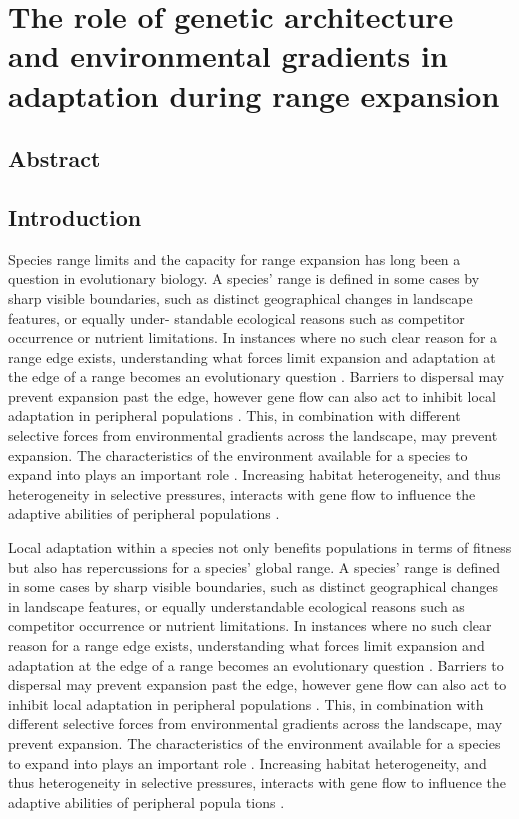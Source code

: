 \chapter{The role of genetic architecture and environmental gradients in adaptation 
during range expansion}
\label{chap:heterogeneouslandscapes}

\section{Abstract}


\section{Introduction}

Species range limits and the capacity for range expansion has long been a question in evolutionary biology. 
A species’ range is defined in some cases by sharp visible boundaries, such as distinct geographical 
changes in landscape features, or equally under- standable ecological reasons such as competitor 
occurrence or nutrient limitations. In instances where no such clear reason for a range edge exists, 
understanding what forces limit expansion and adaptation at the edge of a range becomes an evolutionary 
question \citep{Bridle:2007, Kawecki:2008, Excoffier:2009}. Barriers to dispersal may 
prevent expansion past the edge, however gene flow can also act to inhibit local adaptation in 
peripheral populations \citep{Slatkin:1987, Kirkpatrick:1997}. This, in combination with 
different selective forces from environmental gradients across the landscape, may prevent expansion. 
The characteristics of the environment available for a species to expand into plays an important 
role \citep{Aguilee:2012, Barton:2001, Pease:1989}. Increasing habitat heterogeneity, and 
thus heterogeneity in selective pressures, interacts with gene flow to influence the adaptive 
abilities of peripheral populations \citep{Ronce:2001}.

Local adaptation within a species not only benefits populations in terms of fitness but also has 
repercussions for a species' global range. A species' range is defined in some cases by sharp visible 
boundaries, such as distinct geographical changes in landscape features, or equally understandable 
ecological reasons such as competitor occurrence or nutrient limitations. In instances where no 
such clear reason for a range edge exists, understanding what forces limit expansion and adaptation at 
the edge of a range becomes an evolutionary question \citep{Bridle:2007bi,Kawecki:2008gv,Excoffier:2009em}. 
Barriers to dispersal may prevent expansion past the edge, however gene flow can also act to inhibit local 
adaptation in peripheral populations \citep{Slatkin:1987uf,Kirkpatrick:1997jo}. This, in combination with 
different selective forces from environmental gradients across the landscape, may prevent expansion. The 
characteristics of the environment available for a species to expand into plays an important role 
\citep{Guilee:2012hk,Barton:2001ti,Pease:1989wj}. Increasing habitat heterogeneity, and thus heterogeneity 
in selective pressures, interacts with gene flow to influence the adaptive abilities of peripheral popula
tions \citep{Ronce:2001vpa}.

